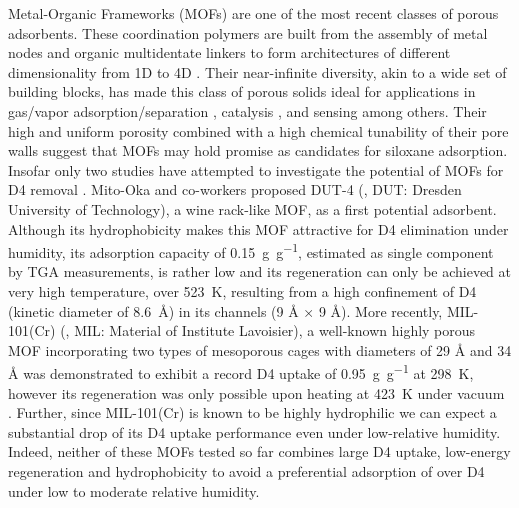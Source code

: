 Metal-Organic Frameworks (MOFs) are one of the most recent classes of porous
adsorbents. These coordination polymers are built from the assembly of metal
nodes and organic multidentate linkers to form architectures of different
dimensionality from 1D to 4D \citep{fereyHybridPorousSolids2008,
zhouIntroductionMetalOrganic2012,
evansFourdimensionalMetalorganicFrameworks2020}. Their near-infinite diversity,
akin to a wide set of building blocks, has made this class of porous solids
ideal for applications in gas/vapor adsorption/separation
\citep{siegelmanChallengesOpportunitiesAdsorptionbased2019,
linMicroporousMetalOrganicFramework2020}, catalysis
\citep{bavykinaMetalOrganicFrameworks2020}, and sensing
\citep{allendorfElectronicDevicesUsing2020,
woellnerAdsorptionDetectionHazardous2018} among others. Their high and uniform
porosity combined with a high chemical tunability of their pore walls suggest
that MOFs may hold promise as candidates for siloxane adsorption. Insofar only
two studies have attempted to investigate the potential of MOFs for D4 removal
\citep{mito-okaSiloxaneD4Capture2013}. Mito-Oka and co-workers
\citep{mito-okaSiloxaneD4Capture2013} proposed DUT-4 (\ce{[Al(OH)(2,6-ndc)},
DUT: Dresden University of Technology), a wine rack-like MOF, as a first
potential adsorbent. Although its hydrophobicity makes this MOF attractive for
D4 elimination under humidity, its adsorption capacity of
\SI{0.15}{\gram\per\gram}, estimated as single component by TGA measurements, is
rather low and its regeneration can only be achieved at very high temperature,
over \SI{523}{\kelvin}, resulting from a high confinement of D4 (kinetic
diameter of \SI{8.6}{\angstrom}) in its channels (9 Å × 9 Å). More recently,
MIL-101(Cr) (, MIL: Material of Institute Lavoisier), a
well-known highly porous MOF incorporating two types of mesoporous cages with
diameters of 29 Å and 34 Å was demonstrated to exhibit a record D4 uptake of
\SI{0.95}{\gram\per\gram} at \SI{298}{\kelvin}, however its regeneration was
only possible upon heating at \SI{423}{\kelvin} under vacuum
\citep{gargiuloChromiumbasedMIL101Metal2019}. Further, since MIL-101(Cr) is
known to be highly hydrophilic \citep{zhaoSynthesisMIL101Cr2020} we can expect a
substantial drop of its D4 uptake performance even under low-relative humidity.
Indeed, neither of these MOFs tested so far combines large D4 uptake, low-energy
regeneration and hydrophobicity to avoid a preferential adsorption of 
over D4 under low to moderate relative humidity.

